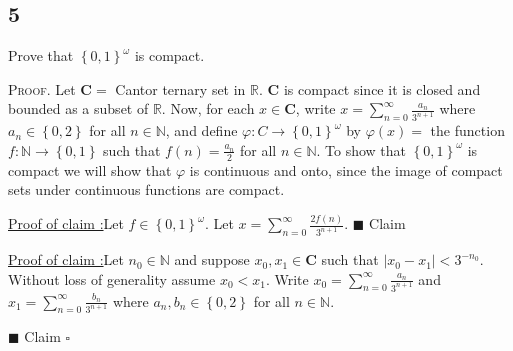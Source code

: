 \documentclass[12pt]{article}
\newcounter{ProofCounter}
\newcounter{ClaimCounter}[ProofCounter]
\newenvironment{Proof}{\stepcounter{ProofCounter}\textsc{Proof.}}{\hfill$\square$}
\newenvironment{claim}[1]{\vspace{1mm}\stepcounter{ClaimCounter}\par\noindent\underline{\bf Claim \theClaimCounter:}\space#1}{}
\newenvironment{claimproof}[1]{\par\noindent\underline{Proof of claim \theClaimCounter:}\space#1}{\hfill $\blacksquare$ Claim \theClaimCounter}
\begin{document}
\newpage
\subsection*{5}
\begin{tcolorbox}
  Prove that $\left\{ 0,1 \right\}^{\omega}$ is compact.
\end{tcolorbox}
\begin{Proof}
  Let $\bm{C} =$ Cantor ternary set in $\mathbb{R}$. $\bm{C}$ is compact since it is closed and bounded as a subset of $\mathbb{R}$. Now, for each $x
  \in \bm{C}$, write $x = \sum_{n=0}^{\infty}\frac{a_n}{3^{n+1}}$ where $a_n \in \left\{ 0,2 \right\}$ for all $n \in \mathbb{N}$, and define
  $\varphi : C \rightarrow \left\{ 0,1 \right\}^{\omega}$ by $\varphi(x) =$ the function $f : \mathbb{N} \rightarrow \left\{ 0,1 \right\}$ such that
  $f(n) = \frac{a_n}{2}$ for all $n \in \mathbb{N}$. To show that $\left\{ 0,1 \right\}^{\omega}$ is compact we will show that $\varphi$ is continuous
  and onto, since the image of compact sets under continuous functions are compact.

  \begin{claimproof}
    Let $f \in \left\{ 0,1 \right\}^{\omega}$. Let $x = \sum_{n=0}^{\infty}\frac{2f(n)}{3^{n+1}}$.
  \end{claimproof}

  \begin{claimproof}
    Let $n_0 \in \mathbb{N}$ and suppose $x_0, x_1 \in \bm{C}$ such that $|x_0 - x_1| < 3^{-n_0}$. Without loss of generality assume $x_0 < x_1$.
    Write $x_0 = \sum_{n=0}^{\infty}\frac{a_n}{3^{n+1}}$ and $x_1 = \sum_{n=0}^{\infty}\frac{b_n}{3^{n+1}}$ where $a_n,b_n \in \left\{ 0,2
    \right\}$ for all $n \in \mathbb{N}$.


\end{claimproof}
\end{Proof}
\end{document}
